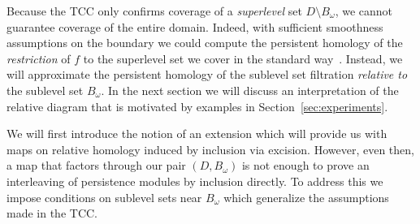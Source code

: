 
Because the TCC only confirms coverage of a \emph{superlevel} set $D\setminus B_\omega$, we cannot guarantee coverage of the entire domain.
Indeed, with sufficient smoothness assumptions on the boundary we could compute the persistent homology of the \emph{restriction} of $f$ to the superlevel set we cover in the standard way~\cite{chazal09analysis}.
Instead, we will approximate the persistent homology of the sublevel set filtration \emph{relative to} the sublevel set $B_\omega$.
In the next section we will discuss an interpretation of the relative diagram that is motivated by examples in Section~\ref{sec:experiments}.

We will first introduce the notion of an extension which will provide us with maps on relative homology induced by inclusion via excision.
However, even then, a map that factors through our pair $(D, B_\omega)$ is not enough to prove an interleaving of persistence modules by inclusion directly.
To address this we impose conditions on sublevel sets near $B_\omega$ which generalize the assumptions made in the TCC.

